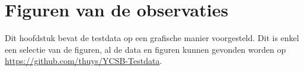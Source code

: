 \chapter{Figuren van de observaties}\label{sec:figobservaties}
Dit hoofdstuk bevat de testdata op een grafische manier voorgesteld. Dit is enkel een selectie van de figuren, al de data en figuren kunnen gevonden worden op \url{https://github.com/thuys/YCSB-Testdata}.  



